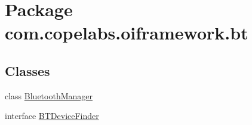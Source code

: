 \hypertarget{namespacecom_1_1copelabs_1_1oiframework_1_1bt}{}\section{Package com.\+copelabs.\+oiframework.\+bt}
\label{namespacecom_1_1copelabs_1_1oiframework_1_1bt}
\subsection*{Classes}
\begin{DoxyCompactItemize}
\item 
class \hyperlink{classcom_1_1copelabs_1_1oiframework_1_1bt_1_1_bluetooth_manager}{Bluetooth\+Manager}
\item 
interface \hyperlink{interfacecom_1_1copelabs_1_1oiframework_1_1bt_1_1_b_t_device_finder}{B\+T\+Device\+Finder}
\end{DoxyCompactItemize}
